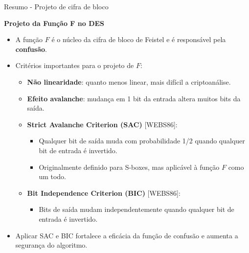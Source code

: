\begin{frame}{Resumo - Projeto de cifra de bloco}

\textbf{Projeto da Função F no DES}
    \begin{itemize}
        \item A função $F$ é o núcleo da cifra de bloco de Feistel e é responsável pela \textbf{confusão}.
        \item Critérios importantes para o projeto de $F$:
        \begin{itemize}
            \item \textbf{Não linearidade}: quanto menos linear, mais difícil a criptoanálise.
            \item \textbf{Efeito avalanche}: mudança em 1 bit da entrada altera muitos bits da saída.
            \item \textbf{Strict Avalanche Criterion (SAC)} [WEBS86]:
            \begin{itemize}
                \item Qualquer bit de saída muda com probabilidade 1/2 quando qualquer bit de entrada é invertido.
                \item Originalmente definido para S-boxes, mas aplicável à função $F$ como um todo.
            \end{itemize}
            \item \textbf{Bit Independence Criterion (BIC)} [WEBS86]:
            \begin{itemize}
                \item Bits de saída mudam independentemente quando qualquer bit de entrada é invertido.
            \end{itemize}
        \end{itemize}
        \item Aplicar SAC e BIC fortalece a eficácia da função de confusão e aumenta a segurança do algoritmo.
    \end{itemize}
\end{frame}

